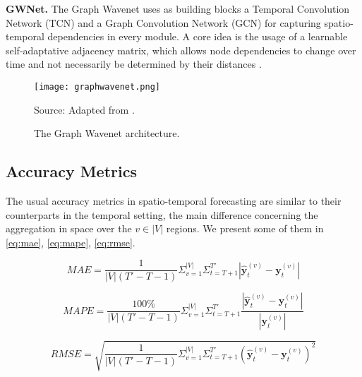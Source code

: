 \noindent
\textbf{GWNet.} The Graph Wavenet uses as building blocks a Temporal Convolution Network (TCN) and a Graph Convolution Network (GCN) for capturing spatio-temporal dependencies in every module. A core idea is the usage of a learnable self-adaptative adjacency matrix, which allows node dependencies to change over time and not necessarily be determined by their distances \cite{wu2019graphwavenet, liu2020intro}.
\begin{figure}[H]
	\centering
    \caption{The Graph Wavenet architecture.}
    \texttt{[image: graphwavenet.png]}  \\
    \raggedright
    Source: Adapted from \cite{wu2019graphwavenet}.
	\label{fig:graphwavenet}
\end{figure}

\subsection{Accuracy Metrics}

The usual accuracy metrics in spatio-temporal forecasting are similar to their counterparts in the temporal setting, the main difference concerning the aggregation in space over the $v \in |V|$ regions.
We present some of them in \ref{eq:mae}, \ref{eq:mape}, \ref{eq:rmse}.

\begin{equation}\label{eq:mae_multi}
    MAE = \frac{1}{|V|(T'-T-1)} \Sigma_{v=1}^{|V|} \Sigma_{t=T+1}^{T'} | \bm{\hat{y}}^{(v)}_{t} - \bm{y}_{t}^{(v)} |
\end{equation}


\begin{equation}\label{eq:mape_multi}
    MAPE = \frac{100\%}{|V|(T'-T-1)}\Sigma_{v=1}^{|V|} \Sigma_{t=T+1}^{T'} \frac{ | \bm{\hat{y}}^{(v)}_{t} - \bm{y}_{t}^{(v)} | }{ |\bm{y}_{t}^{(v)}| }
\end{equation}


\begin{equation}\label{eq:rmse_multi}
    RMSE = \sqrt{ \frac{1}{|V|(T'-T-1)} \Sigma_{v=1}^{|V|} \Sigma_{t=T+1}^{T'} (\bm{\hat{y}}^{(v)}_{t} - \bm{y}_{t}^{(v)})^2 }
\end{equation}

